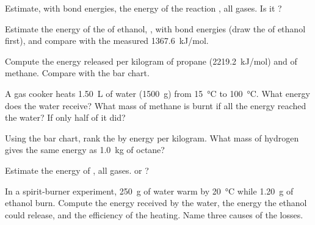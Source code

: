 \begin{exercise}[$\star\star$]\label{exo:g11:reaction-energy:6}
Estimate, with bond energies, the energy of the reaction
, all gases. Is it ?
\end{exercise}

\begin{exercise}[$\star\star$]\label{exo:g11:reaction-energy:7}
Estimate the energy of the  of ethanol, , with bond energies (draw the  of ethanol
first), and compare with the measured \qty{1367.6}{kJ/mol}.
\end{exercise}

\begin{exercise}[$\star\star$]\label{exo:g11:reaction-energy:8}
Compute the energy released per kilogram of propane
(\qty{2219.2}{kJ/mol}) and of methane. Compare with the bar chart.
\end{exercise}

\begin{exercise}[$\star\star$]\label{exo:g11:reaction-energy:9}
A gas cooker heats \qty{1.50}{L} of water (\qty{1500}{g}) from
\qty{15}{\celsius} to \qty{100}{\celsius}. What energy does the water
receive? What mass of methane is burnt if all the energy reached the
water? If only half of it did?
\end{exercise}

\begin{exercise}[$\star\star$]\label{exo:g11:reaction-energy:10}
Using the bar chart, rank the  by energy per kilogram. What mass of
hydrogen gives the same energy as \qty{1.0}{kg} of octane?
\end{exercise}

\begin{exercise}[$\star\star$]\label{exo:g11:reaction-energy:11}
Estimate the energy of , all gases.  or
?
\end{exercise}

\begin{exercise}[$\star\star\star$]\label{exo:g11:reaction-energy:12}
In a spirit-burner experiment, \qty{250}{g} of water warm by
\qty{20}{\celsius} while \qty{1.20}{g} of ethanol burn. Compute the
energy received by the water, the energy the ethanol could release, and
the efficiency of the heating. Name three causes of the losses.
\end{exercise}


